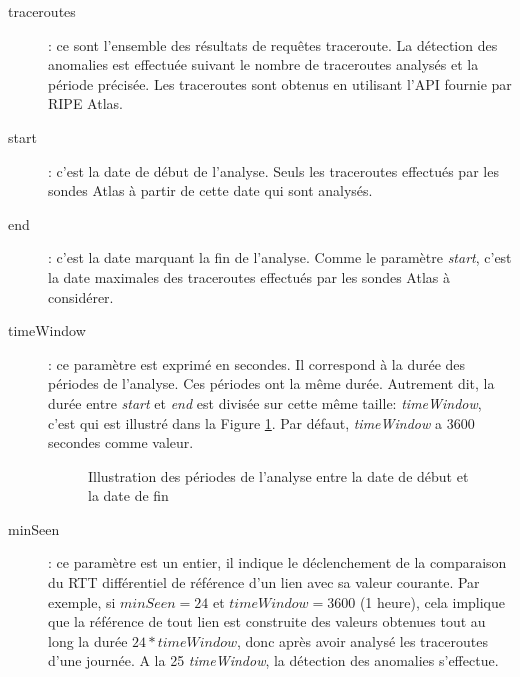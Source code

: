 \begin{description}
	
	\item[traceroutes] : ce sont l'ensemble des résultats de requêtes traceroute. La détection des anomalies est effectuée suivant le nombre de traceroutes analysés et la période précisée. Les  traceroutes sont obtenus en utilisant l'API fournie par RIPE Atlas.
	
	\item[start] : c'est la date de début de l'analyse. Seuls les traceroutes effectués par les sondes Atlas à partir de cette date qui sont analysés.

\item[end]  : c'est la date marquant la fin de l'analyse. Comme le paramètre \textit{start}, c'est la date maximales des  traceroutes effectués par les sondes Atlas à considérer.

\item[timeWindow]:  ce paramètre est exprimé en secondes. Il correspond à la durée des périodes de l'analyse. Ces périodes ont la même durée. Autrement dit, la durée entre   \textit{start} et \textit{end} est divisée sur
 cette même taille: \textit{timeWindow}, c'est qui est illustré dans la Figure  \ref{fig:timing_tex}. Par défaut, \textit{timeWindow} a $ 3600 $ secondes comme valeur.




\begin{figure}[h]
	\centering
	\captionsetup{justification=centering}
	
	\caption{Illustration des périodes de l'analyse entre la date de début et la date de fin}
	\label{fig:timing_tex}
\end{figure}
%		 

\item[minSeen] : 
ce paramètre est un entier, il indique le déclenchement de la comparaison du RTT différentiel de référence d'un lien avec sa valeur courante.  Par exemple, si $ minSeen = 24 $ et $timeWindow = 3600$ (1 heure), cela implique que la référence de tout lien est construite des valeurs obtenues tout au long la durée $24 * timeWindow$, donc après avoir analysé les traceroutes d'une journée. A la 25 \textit{timeWindow}, la détection des anomalies s'effectue.


\end{description}
